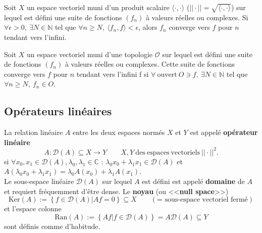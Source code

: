 \begin{definition}
    Soit $X$ un espace vectoriel muni d'un produit scalaire $\langle\cdot,\cdot\rangle$ ($||\cdot|| = \sqrt{\langle\cdot,\cdot\rangle}$) sur lequel est défini une suite de fonctions $(f_n)$ à valeurs réelles ou complexes. Si $\forall \epsilon > 0,\ \exists N\in\mathbb{N}$ tel que $\forall n\geq N,\ \langle f_n,f \rangle <\epsilon$, alors $f_n$ converge vers $f$ pour $n$ tendant vers l'infini.
\end{definition}

\begin{definition}
    Soit $X$ un espace vectoriel muni d'une topologie $\mathcal{O}$ sur lequel est défini une suite de fonctions $(f_n)$ à valeurs réelles ou complexes. Cette suite de fonctions converge vers $f$ pour $n$ tendant vers l'infini f si $\forall \ \text{ouvert}\ O \ni f,\ \exists N\in\mathbb{N}$ tel que $\forall n\geq N,\ f_n \in O$.
\end{definition}


\subsection{Opérateurs linéaires}

\begin{definition}
    La relation linéaire $A$ entre les deux espaces normés $X$ et $Y$ est appelé \textbf{opérateur linéaire}
    \begin{equation*}
        A:\mathcal{D}(A)\subseteq X\rightarrow Y \qquad X,Y\ \mathrm{des\ espaces\ vectoriels}\ ||\cdot||^2.
    \end{equation*}
    si $\forall x_0,x_1 \in \mathcal{D}(A), \lambda_0,\lambda_1 \in \mathbb{C}$ : $\lambda_0x_0 + \lambda_1x_1 \in \mathcal{D}(A)$ et $A(\lambda_0x_0 + \lambda_1x_1) = \lambda_0A(x_0) + \lambda_1A(x_1)$.\\
    
    Le sous-espace linéaire $\mathcal{D}(A)$ sur lequel $A$ est défini est appelé \textbf{domaine} de $A$ et requiert fréquemment d'être dense. Le \textbf{noyau} (ou <<\textbf{null space}>>)
    \begin{equation*}
        \mathrm{Ker}(A) := \left\{ f\in\mathcal{D}(A)|Af = 0 \right\} \subseteq X \qquad (\text{= sous-espace vectoriel fermé})
    \end{equation*}
    et l'espace colonne
    \begin{equation*}
        \mathrm{Ran}(A) := \left\{ Af|f\in\mathcal{D}(A) \right\} = A\mathcal{D}(A) \subseteq Y
    \end{equation*}
    sont définis comme d'habitude.
\end{definition}

